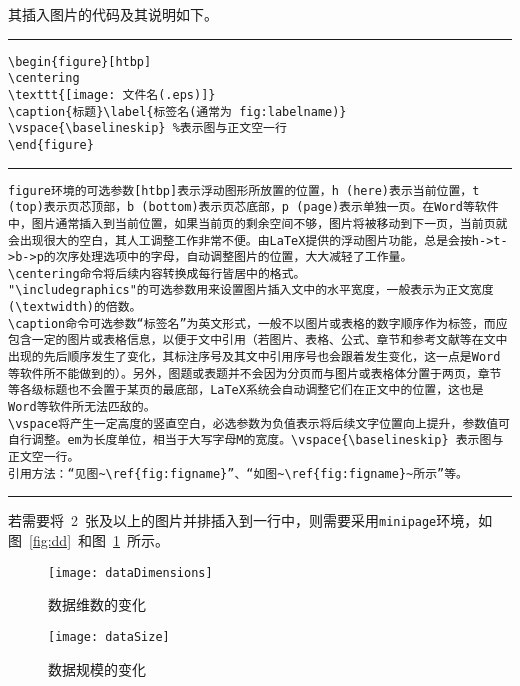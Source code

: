 其插入图片的代码及其说明如下。
\vspace{1em}\noindent\hrule
\begin{verbatim}
\begin{figure}[htbp]
\centering
\texttt{[image: 文件名(.eps)]}
\caption{标题}\label{标签名(通常为 fig:labelname)}
\vspace{\baselineskip} %表示图与正文空一行
\end{figure}
\end{verbatim}

\noindent\hrule

\begin{verbatim}
figure环境的可选参数[htbp]表示浮动图形所放置的位置，h (here)表示当前位置，t (top)表示页芯顶部，b (bottom)表示页芯底部，p (page)表示单独一页。在Word等软件中，图片通常插入到当前位置，如果当前页的剩余空间不够，图片将被移动到下一页，当前页就会出现很大的空白，其人工调整工作非常不便。由LaTeX提供的浮动图片功能，总是会按h->t->b->p的次序处理选项中的字母，自动调整图片的位置，大大减轻了工作量。
\centering命令将后续内容转换成每行皆居中的格式。
"\includegraphics"的可选参数用来设置图片插入文中的水平宽度，一般表示为正文宽度(\textwidth)的倍数。
\caption命令可选参数“标签名”为英文形式，一般不以图片或表格的数字顺序作为标签，而应包含一定的图片或表格信息，以便于文中引用（若图片、表格、公式、章节和参考文献等在文中出现的先后顺序发生了变化，其标注序号及其文中引用序号也会跟着发生变化，这一点是Word等软件所不能做到的）。另外，图题或表题并不会因为分页而与图片或表格体分置于两页，章节等各级标题也不会置于某页的最底部，LaTeX系统会自动调整它们在正文中的位置，这也是Word等软件所无法匹敌的。
\vspace将产生一定高度的竖直空白，必选参数为负值表示将后续文字位置向上提升，参数值可自行调整。em为长度单位，相当于大写字母M的宽度。\vspace{\baselineskip} 表示图与正文空一行。
引用方法：“见图~\ref{fig:figname}”、“如图~\ref{fig:figname}~所示”等。
\end{verbatim}

\noindent\hrule\vspace{1em}

若需要将~2~张及以上的图片并排插入到一行中，则需要采用\verb|minipage|环境，如图~\ref{fig:dd}~和图~\ref{fig:ds}~所示。
\begin{figure}[htbp]
\centering
\begin{minipage}{0.4\textwidth}
\centering
\texttt{[image: dataDimensions]}
\caption{数据维数的变化}\label{fig:dd}
\end{minipage}
\begin{minipage}{0.4\textwidth}
\centering
\texttt{[image: dataSize]}
\caption{数据规模的变化}\label{fig:ds}
\end{minipage}
\vspace{\baselineskip}
\end{figure}

